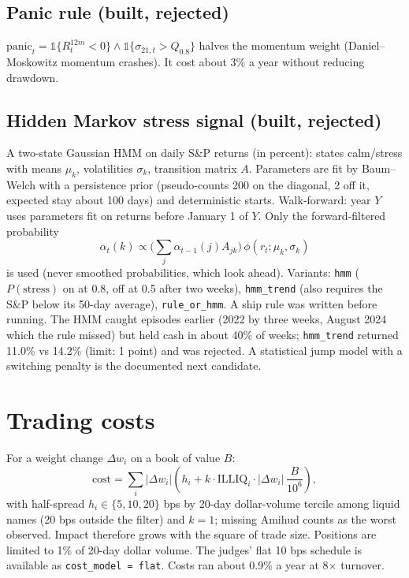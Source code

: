 \documentclass[11pt]{article}
\newcommand{\code}[1]{\texttt{#1}}
\begin{document}
\subsection{Panic rule (built, rejected)}
$\text{panic}_t = \mathbb{1}\{R^{12m}_t<0\}\wedge\mathbb{1}\{\sigma_{21,t}>Q_{0.8}\}$ halves the momentum weight
(Daniel--Moskowitz momentum crashes). It cost about 3\% a year without reducing drawdown.

\subsection{Hidden Markov stress signal (built, rejected)}
A two-state Gaussian HMM on daily S\&P returns (in percent): states calm/stress with means $\mu_k$, volatilities
$\sigma_k$, transition matrix $A$. Parameters are fit by Baum--Welch with a persistence prior (pseudo-counts 200 on the
diagonal, 2 off it, expected stay about 100 days) and deterministic starts. Walk-forward: year $Y$ uses parameters
fit on returns before January 1 of $Y$. Only the forward-filtered probability
\[
\alpha_t(k) \propto \Big(\sum_j \alpha_{t-1}(j)A_{jk}\Big)\,\phi(r_t;\mu_k,\sigma_k)
\]
is used (never smoothed probabilities, which look ahead). Variants: \code{hmm} ($P(\text{stress})$ on at 0.8, off at
0.5 after two weeks), \code{hmm\_trend} (also requires the S\&P below its 50-day average), \code{rule\_or\_hmm}. A ship
rule was written before running. The HMM caught episodes earlier (2022 by three weeks, August 2024 which the rule
missed) but held cash in about 40\% of weeks; \code{hmm\_trend} returned 11.0\% vs 14.2\% (limit: 1 point) and was
rejected. A statistical jump model with a switching penalty is the documented next candidate.

\section{Trading costs}
For a weight change $\Delta w_i$ on a book of value $B$:
\[
\text{cost} = \sum_i |\Delta w_i|\left(h_i + k\cdot \text{ILLIQ}_i \cdot |\Delta w_i|\, \frac{B}{10^6}\right),
\]
with half-spread $h_i\in\{5,10,20\}$ bps by 20-day dollar-volume tercile among liquid names (20 bps outside the filter)
and $k=1$; missing Amihud counts as the worst observed. Impact therefore grows with the square of trade size. Positions
are limited to 1\% of 20-day dollar volume. The judges' flat 10 bps schedule is available as \code{cost\_model = flat}.
Costs ran about 0.9\% a year at 8$\times$ turnover.
\end{document}
